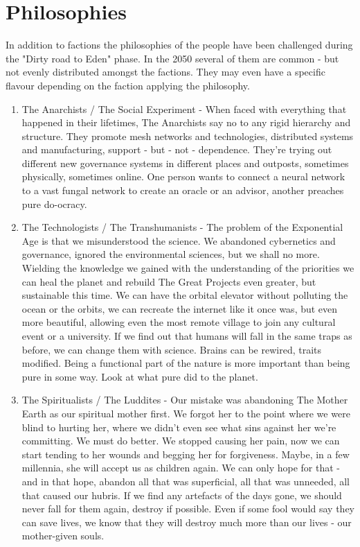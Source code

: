 \chapter{Philosophies}

In addition to factions the philosophies of the people have been challenged during the "Dirty road to Eden" phase. In the 2050 several of them are common - but not evenly distributed amongst the factions. They may even have a specific flavour depending on the faction applying the philosophy.

\begin{enumerate}
\item The Anarchists / The Social Experiment - When faced with everything that happened in their lifetimes, The Anarchists say no to any rigid hierarchy and structure. They promote mesh networks and technologies, distributed systems and manufacturing, support - but - not - dependence. They're trying out different new governance systems in different places and outposts, sometimes physically, sometimes online. One person wants to connect a neural network to a vast fungal network to create an oracle or an advisor, another preaches pure do-ocracy.

\item The Technologists / The Transhumanists - The problem of the Exponential Age is that we misunderstood the science. We abandoned cybernetics and governance, ignored the environmental sciences, but we shall no more. Wielding the knowledge we gained with the understanding of the priorities we can heal the planet and rebuild The Great Projects even greater, but sustainable this time. We can have the orbital elevator without polluting the ocean or the orbits, we can recreate the internet like it once was, but even more beautiful, allowing even the most remote village to join any cultural event or a university. If we find out that humans will fall in the same traps as before, we can change them with science. Brains can be rewired, traits modified. Being a functional part of the nature is more important than being pure in some way. Look at what pure did to the planet.

\item The Spiritualists / The Luddites - Our mistake was abandoning The Mother Earth as our spiritual mother first. We forgot her to the point where we were blind to hurting her, where we didn't even see what sins against her we're committing. We must do better. We stopped causing her pain, now we can start tending to her wounds and begging her for forgiveness. Maybe, in a few millennia, she will accept us as children again. We can only hope for that - and in that hope, abandon all that was superficial, all that was unneeded, all that caused our hubris. If we find any artefacts of the days gone, we should never fall for them again, destroy if possible. Even if some fool would say they can save lives, we know that they will destroy much more than our lives - our mother-given souls.


\end{enumerate}
